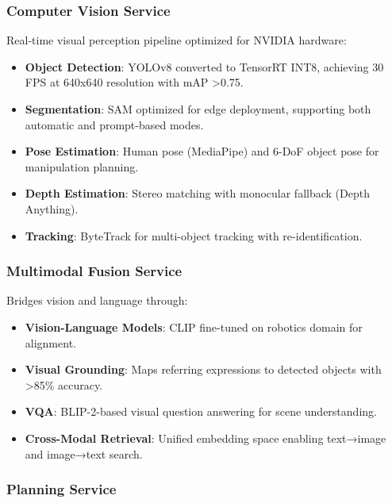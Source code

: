 \documentclass[conference]{IEEEtran}
\begin{document}
\subsubsection{Computer Vision Service}

Real-time visual perception pipeline optimized for NVIDIA hardware:

\begin{itemize}
    \item \textbf{Object Detection}: YOLOv8 converted to TensorRT INT8, achieving 30 FPS at 640x640 resolution with mAP >0.75.
    
    \item \textbf{Segmentation}: SAM optimized for edge deployment, supporting both automatic and prompt-based modes.
    
    \item \textbf{Pose Estimation}: Human pose (MediaPipe) and 6-DoF object pose for manipulation planning.
    
    \item \textbf{Depth Estimation}: Stereo matching with monocular fallback (Depth Anything).
    
    \item \textbf{Tracking}: ByteTrack for multi-object tracking with re-identification.
\end{itemize}

\subsubsection{Multimodal Fusion Service}

Bridges vision and language through:

\begin{itemize}
    \item \textbf{Vision-Language Models}: CLIP fine-tuned on robotics domain for alignment.
    
    \item \textbf{Visual Grounding}: Maps referring expressions to detected objects with >85\% accuracy.
    
    \item \textbf{VQA}: BLIP-2-based visual question answering for scene understanding.
    
    \item \textbf{Cross-Modal Retrieval}: Unified embedding space enabling text→image and image→text search.
\end{itemize}

\subsubsection{Planning Service}
\end{document}
